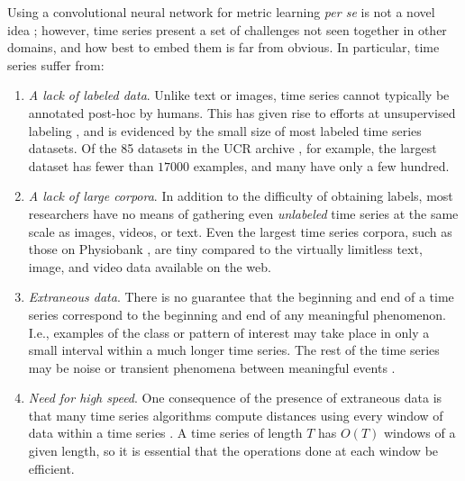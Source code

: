 Using a convolutional neural network for metric learning \textit{per se} is not a novel idea \citep{deepLifted, facenet}; however, time series present a set of challenges not seen together in other domains, and how best to embed them is far from obvious. In particular, time series suffer from:
\begin{enumerate}
\item \textit{A lack of labeled data}. Unlike text or images, time series cannot typically be annotated post-hoc by humans. This has given rise to efforts at unsupervised labeling \citep{extract}, and is evidenced by the small size of most labeled time series datasets. Of the 85 datasets in the UCR archive \citep{ucrArchive}, for example, the largest dataset has fewer than $17000$ examples, and many have only a few hundred.
\item \textit{A lack of large corpora}. In addition to the difficulty of obtaining labels, most researchers have no means of gathering even \textit{unlabeled} time series at the same scale as images, videos, or text. Even the largest time series corpora, such as those on Physiobank \citep{physiobank}, are tiny compared to the virtually limitless text, image, and video data available on the web. 
\item \textit{Extraneous data}. There is no guarantee that the beginning and end of a time series correspond to the beginning and end of any meaningful phenomenon. I.e., examples of the class or pattern of interest may take place in only a small interval within a much longer time series. The rest of the time series may be noise or transient phenomena between meaningful events \citep{epenthesis,neverEnding}.
\item \textit{Need for high speed}. One consequence of the presence of extraneous data is that many time series algorithms compute distances using every window of data within a time series \citep{motifExact,extract,epenthesis}. A time series of length $T$ has $O(T)$ windows of a given length, so it is essential that the operations done at each window be efficient. 
\end{enumerate}


